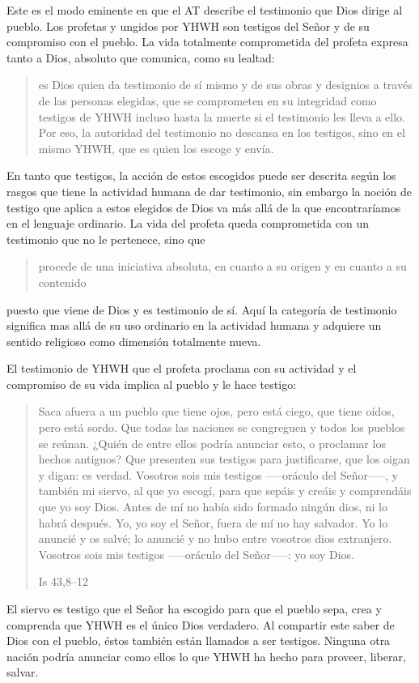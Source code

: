 Este es el modo eminente en que el AT describe el testimonio que Dios dirige al
pueblo. Los profetas y ungidos por YHWH son testigos del Señor y de su
compromiso con el pueblo. La vida totalmente comprometida del profeta expresa
tanto a Dios, absoluto que comunica, como su lealtad:
\blockquote[{\cite[116s]{prades2015testimonio}}]{es Dios quien da testimonio de
  sí mismo y de sus obras y designios a través de las personas elegidas, que se
  comprometen en su integridad como testigos de YHWH incluso hasta la muerte si
  el testimonio les lleva a ello. Por eso, la autoridad del testimonio no
  descansa en los testigos, sino en el mismo YHWH, que es quien los escoge y
  envía.}
En tanto que testigos, la acción de estos escogidos puede ser descrita según los
rasgos que tiene la actividad humana de dar testimonio, sin embargo la noción de
testigo que aplica a estos elegidos de Dios va más allá de la que encontraríamos
en el lenguaje ordinario. La vida del profeta queda comprometida con un
testimonio que no le pertenece, sino que
\blockquote[{\cite[118]{prades2015testimonio}}]{procede de una iniciativa
  absoluta, en cuanto a su origen y en cuanto a su contenido}
puesto que viene de Dios y es testimonio de sí. Aquí la categoría de testimonio
significa mas allá de su uso ordinario en la actividad humana y adquiere un
sentido religioso como dimensión totalmente
nueva\autocite[Cf.][118]{prades2015testimonio}.

El testimonio de YHWH que el profeta proclama con su actividad y el compromiso
de su vida implica al pueblo y le hace testigo:
\blockquote[{Is 43,8--12}]{Saca afuera a un pueblo que tiene ojos, pero está
  ciego, que tiene oídos, pero está sordo. Que todas las naciones se congreguen
  y todos los pueblos se reúnan. ¿Quién de entre ellos podría anunciar esto, o
  proclamar los hechos antiguos? Que presenten sus testigos para justificarse,
  que los oigan y digan: es verdad. Vosotros sois mis testigos --—oráculo del
  Señor--—, y también mi siervo, al que yo escogí, para que sepáis y creáis y
  comprendáis que yo soy Dios. Antes de mí no había sido formado ningún dios, ni
  lo habrá después. Yo, yo soy el Señor, fuera de mí no hay salvador. Yo lo
  anuncié y os salvé; lo anuncié y no hubo entre vosotros dios extranjero.
  Vosotros sois mis testigos --—oráculo del Señor--—: yo soy Dios.}
El siervo es testigo que el Señor ha escogido para que el pueblo sepa, crea y
comprenda que YHWH es el único Dios verdadero. Al compartir este saber de Dios
con el pueblo, éstos también están llamados a ser testigos. Ninguna otra nación
podría anunciar como ellos lo que YHWH ha hecho para proveer, liberar, salvar.

